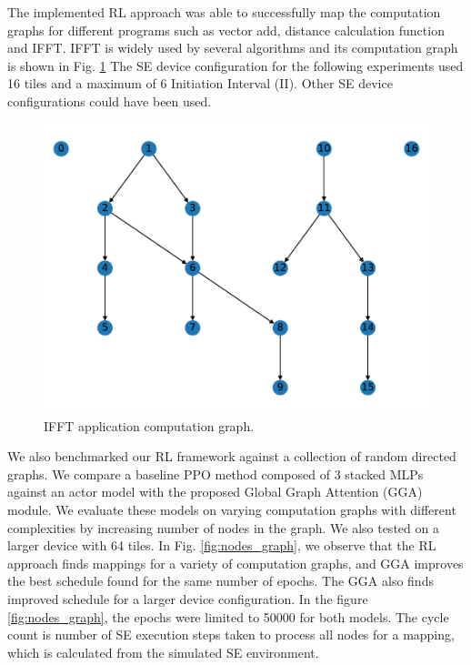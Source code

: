 The implemented RL approach was able to successfully map the computation graphs for different programs such as vector add, distance calculation function and IFFT. 
IFFT is widely used by several algorithms and its computation graph is shown in Fig. \ref{fig:ifft_graph} 
The SE device configuration for the following experiments used 16 tiles and a maximum of 6 Initiation Interval (II).
Other SE device configurations could have been used.

\begin{figure}[h]
  \centering
  \includegraphics[scale=0.4]{fig/ifft_graph.pdf}
  \caption{IFFT application computation graph.}
  \label{fig:ifft_graph}
\end{figure}


We also benchmarked our RL framework against a collection of random directed graphs. 
We compare a baseline PPO method composed of 3 stacked MLPs against an actor model with the proposed Global Graph Attention (GGA) module.
We evaluate these models on varying computation graphs with different complexities by increasing number of nodes in the graph. 
We also tested on a larger device with 64 tiles.
In Fig. \ref{fig:nodes_graph}, we observe that the RL approach finds mappings for a variety of computation graphs, and GGA
improves the best schedule found for the same number of epochs. The GGA also finds improved schedule for a larger device configuration. 
In the figure \ref{fig:nodes_graph}, the epochs were limited to 50000 for both models. 
The cycle count is number of SE execution steps taken to process all nodes for a mapping, which is calculated from the simulated SE environment. 

